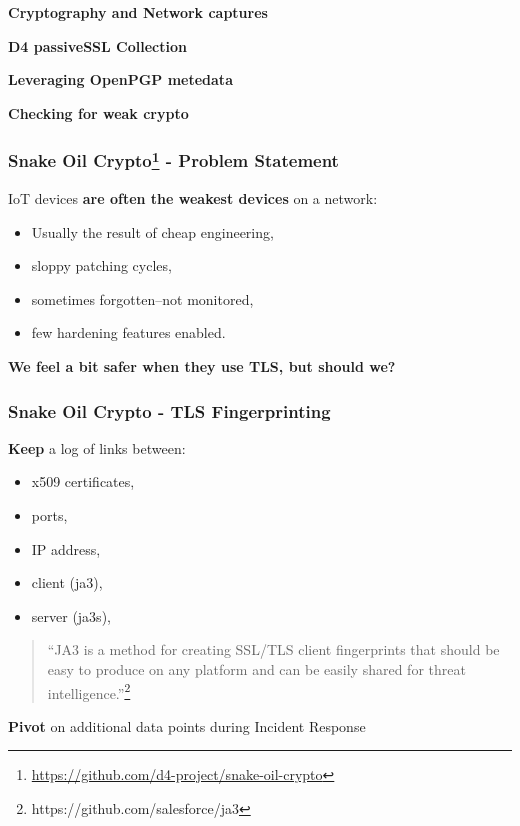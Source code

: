 \documentclass{beamer}
\begin{document}
\begin{frame}
  \begin{center}
    {\bf Cryptography and Network captures}
  \end{center}
\end{frame}

\begin{frame}
  \begin{center}
    {\bf D4 passiveSSL Collection}
  \end{center}
\end{frame}

\begin{frame}
  \begin{center}
    {\bf Leveraging OpenPGP metedata}
  \end{center}
\end{frame}

\begin{frame}
  \begin{center}
    {\bf Checking for weak crypto}
  \end{center}
\end{frame}

\begin{frame}
  \frametitle{Snake Oil Crypto\footnote{\url{https://github.com/d4-project/snake-oil-crypto}} - Problem Statement}
  IoT devices {\bf are often the weakest devices} on a network:
        \begin{itemize}
        \item Usually the result of cheap engineering,
        \item sloppy patching cycles,
        \item sometimes forgotten--not monitored,
        \item few hardening features enabled.
        \end{itemize}

        \vspace{10 mm} 

{\bf We feel a bit safer when they use TLS, but should we?}

\end{frame}

\begin{frame}
  \frametitle{Snake Oil Crypto - TLS Fingerprinting}
        {\bf Keep} a log of links between:
        \begin{itemize}
          \item x509 certificates,
          \item ports,
          \item IP address,
          \item client (ja3),
          \item server (ja3s),
        \end{itemize}
        \begin{quote}
        ``JA3 is a method for creating SSL/TLS client fingerprints that should be easy to produce on any platform and can be easily shared for threat intelligence.''\footnote{https://github.com/salesforce/ja3}
        \end{quote}

         {\bf Pivot} on additional data points during Incident Response 
\end{frame}
\end{document}
